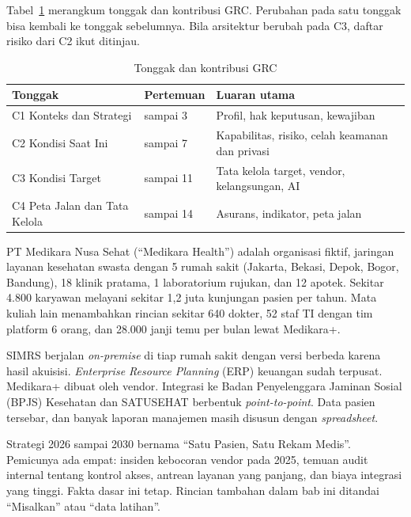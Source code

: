 Tabel~\ref{tab:ch01-capstone} merangkum tonggak dan kontribusi GRC. Perubahan pada satu
tonggak bisa kembali ke tonggak sebelumnya. Bila arsitektur berubah pada C3, daftar risiko
dari C2 ikut ditinjau.

\begin{table}[!htb]
  \centering\small
  \caption{Tonggak dan kontribusi GRC}\label{tab:ch01-capstone}
  \begin{tabularx}{\textwidth}{|>{\raggedright\arraybackslash}p{}|>{\raggedright\arraybackslash}p{}|>{\raggedright\arraybackslash}X|}
    \hline
    \textbf{Tonggak} & \textbf{Pertemuan} & \textbf{Luaran utama} \\ \hline
    C1 Konteks dan Strategi & 1 sampai 3 & Profil, hak keputusan, kewajiban \\ \hline
    C2 Kondisi Saat Ini & 4 sampai 7 & Kapabilitas, risiko, celah keamanan dan privasi \\
    \hline
    C3 Kondisi Target & 8 sampai 11 & Tata kelola target, vendor, kelangsungan, AI \\
    \hline
    C4 Peta Jalan dan Tata Kelola & 12 sampai 14 & Asurans, indikator, peta jalan \\
    \hline
  \end{tabularx}
\end{table}

\begin{kasus}[title={Kasus Medikara Health: Profil yang Dipakai Bersama}]
PT Medikara Nusa Sehat (``Medikara Health'') adalah organisasi fiktif, jaringan layanan
kesehatan swasta dengan 5 rumah sakit (Jakarta, Bekasi, Depok, Bogor, Bandung), 18 klinik
pratama, 1 laboratorium rujukan, dan 12 apotek. Sekitar 4.800 karyawan melayani sekitar 1,2
juta kunjungan pasien per tahun. Mata kuliah lain menambahkan rincian sekitar 640 dokter, 52
staf TI dengan tim platform 6 orang, dan 28.000 janji temu per bulan lewat Medikara+.

SIMRS berjalan \textit{on-premise} di tiap rumah sakit dengan versi berbeda karena hasil
akuisisi. \textit{Enterprise Resource Planning} (ERP)
keuangan sudah terpusat. Medikara+ dibuat oleh vendor. Integrasi ke Badan Penyelenggara
Jaminan Sosial (BPJS) Kesehatan dan SATUSEHAT berbentuk \textit{point-to-point}. Data pasien
tersebar, dan banyak laporan manajemen masih disusun dengan \textit{spreadsheet}.

Strategi 2026 sampai 2030 bernama ``Satu Pasien, Satu Rekam Medis''. Pemicunya ada empat:
insiden kebocoran vendor pada 2025, temuan audit internal tentang kontrol akses, antrean
layanan yang panjang, dan biaya integrasi yang tinggi. Fakta dasar ini tetap. Rincian
tambahan dalam bab ini ditandai ``Misalkan'' atau ``data latihan''.
\end{kasus}

